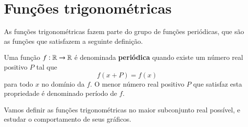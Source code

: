   
  \section{Funções trigonométricas}

  As funções trigonométricas fazem parte do grupo de funções periódicas, que são as funções que satisfazem a seguinte definição.
  
  \begin{defi}
   Uma função $f: \mathbb{R} \rightarrow \mathbb{R}$ é denominada \textbf{periódica} quando existe um número real positivo $P$ tal que
   \[f(x + P)= f(x)\]
   para todo $x$ no domínio da $f$. O menor número real positivo $P$ que satisfaz esta propriedade é denominado período de $f$.
  \end{defi}

  Vamos definir as funções trigonométricas no maior subconjunto real possível, e estudar o comportamento de seus gráficos.


